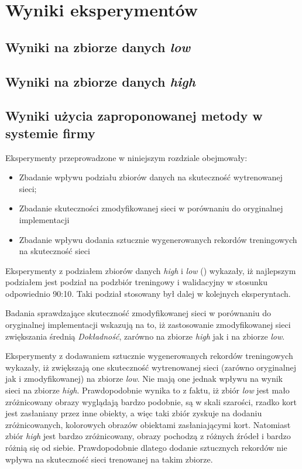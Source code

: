 \section{Wyniki eksperymentów}

\subsection{Wyniki na zbiorze danych \textit{low}}
\subsection{Wyniki na zbiorze danych \textit{high}}
\subsection{Wyniki użycia zaproponowanej metody w systemie firmy \blue{}}
\TODO{}

Eksperymenty przeprowadzone w niniejszym rozdziale obejmowały:
\begin{itemize}
 \item Zbadanie wpływu podziału zbiorów danych na skuteczność wytrenowanej sieci;
 \item Zbadanie skuteczności zmodyfikowanej sieci w porównaniu do oryginalnej implementacji
 \item Zbadanie wpływu dodania sztucznie wygenerowanych rekordów treningowych na skuteczność sieci
\end{itemize}

Eksperymenty z podziałem zbiorów danych \textit{high} i \textit{low} () wykazały, iż najlepszym podziałem jest podział na podzbiór treningowy i walidacyjny w stosunku odpowiednio 90:10. Taki podział stosowany był dalej w kolejnych eksperyntach.


Badania sprawdzające skuteczność zmodyfikowanej sieci w porównaniu do oryginalnej implementacji wskazują na to, iż zastosowanie zmodyfikowanej sieci zwiększania średnią \textit{Dokładność}, zarówno na zbiorze \textit{high} jak i na zbiorze \textit{low}.


Eksperymenty z dodawaniem sztucznie wygenerowanych rekordów treningowych wykazały, iż zwiększają one skuteczność wytrenowanej sieci (zarówno oryginalnej jak i zmodyfikowanej) na zbiorze \textit{low}. Nie mają one jednak wpływu na wynik sieci na zbiorze \textit{high}. Prawdopodobnie wynika to z faktu, iż zbiór \textit{low} jest mało zróżnicowany obrazy wyglądają bardzo podobnie, są w skali szarości, rzadko kort jest zasłaniany przez inne obiekty, a więc taki zbiór zyskuje na dodaniu zróżnicowanych, kolorowych obrazów obiektami zasłaniającymi kort. Natomiast zbiór \textit{high} jest bardzo zróżnicowany, obrazy pochodzą z różnych źródeł i bardzo różnią się od siebie. Prawdopodobnie dlatego dodanie sztucznych rekordów nie wpływa na skuteczność sieci trenowanej na takim zbiorze.
